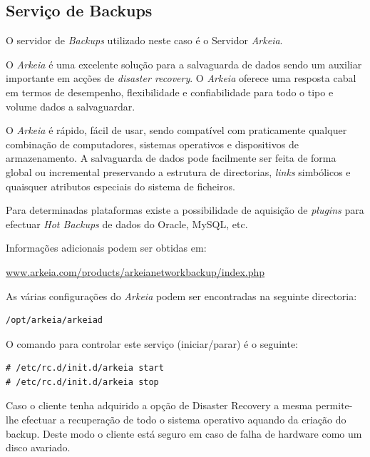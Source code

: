 \subsection{Serviço de Backups}

O servidor de \emph{Backups} utilizado neste caso é o Servidor \emph{Arkeia}.

O \emph{Arkeia} é uma excelente solução para a salvaguarda de dados sendo um auxiliar importante em acções de \emph{disaster recovery}. O \emph{Arkeia} oferece uma resposta cabal em termos de desempenho, flexibilidade e confiabilidade para todo o tipo e volume dados a salvaguardar.

O \emph{Arkeia} é rápido, fácil de usar, sendo compatível com praticamente qualquer combinação de computadores, sistemas operativos e dispositivos de armazenamento. A salvaguarda de dados pode facilmente ser feita de forma global ou incremental preservando a estrutura de directorias, \emph{links} simbólicos e quaisquer atributos especiais do sistema de ficheiros.

Para determinadas plataformas existe a possibilidade de aquisição de \textit{plugins} para efectuar \textit{Hot Backups} de dados do Oracle, MySQL, etc.

Informações adicionais podem ser obtidas em:\\ \begin{normalsize}\sffamily\href{http://www.arkeia.com/products/arkeianetworkbackup/index.php}{www.arkeia.com/products/arkeianetworkbackup/index.php}\end{normalsize}

As várias configurações do \emph{Arkeia} podem ser encontradas na seguinte directoria:

\begin{Verbatim}[commandchars=\\\{\}]
/opt/arkeia/arkeiad
\end{Verbatim}

O comando para controlar este serviço (iniciar/parar) é o seguinte:

\begin{Verbatim}[commandchars=\\\{\}]
# /etc/rc.d/init.d/arkeia start
# /etc/rc.d/init.d/arkeia stop
\end{Verbatim}

Caso o cliente tenha adquirido a opção de Disaster Recovery a mesma permite-lhe efectuar a recuperação de todo o sistema operativo aquando da criação do backup. Deste modo o cliente está seguro em caso de falha de hardware como um disco avariado.

